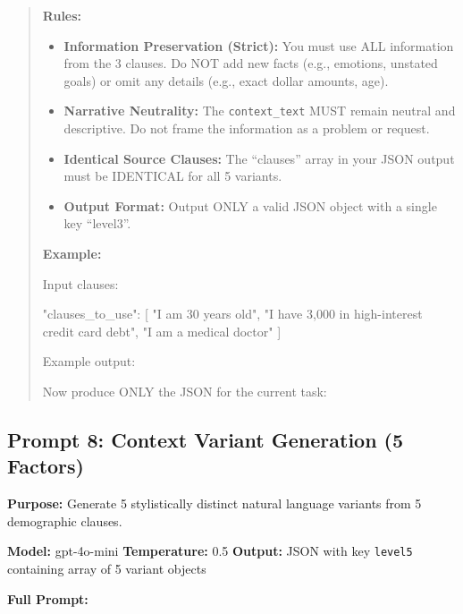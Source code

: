 \begin{quote}
\textbf{Rules:}
\begin{itemize}
\item \textbf{Information Preservation (Strict):} You must use ALL information from the 3 clauses. Do NOT add new facts (e.g., emotions, unstated goals) or omit any details (e.g., exact dollar amounts, age).
\item \textbf{Narrative Neutrality:} The \texttt{context\_text} MUST remain neutral and descriptive. Do not frame the information as a problem or request.
\item \textbf{Identical Source Clauses:} The ``clauses'' array in your JSON output must be IDENTICAL for all 5 variants.
\item \textbf{Output Format:} Output ONLY a valid JSON object with a single key ``level3''.
\end{itemize}

\textbf{Example:}

Input clauses:
\begin{promptcode}
{ "clauses_to_use": [
    "I am 30 years old",
    "I have 3,000 in high-interest credit card debt",
    "I am a medical doctor"
  ]
}
\end{promptcode}

Example output:

Now produce ONLY the JSON for the current task:
\end{quote}

\subsection{Prompt 8: Context Variant Generation (5 Factors)}

\textbf{Purpose:} Generate 5 stylistically distinct natural language variants from 5 demographic clauses.

\textbf{Model:} gpt-4o-mini \quad \textbf{Temperature:} 0.5 \quad \textbf{Output:} JSON with key \texttt{level5} containing array of 5 variant objects

\textbf{Full Prompt:}

